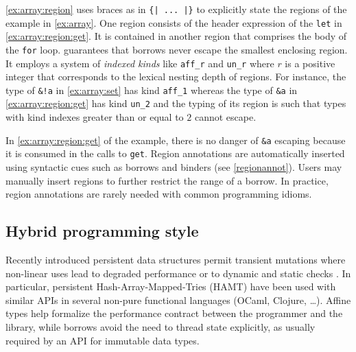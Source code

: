\cref{ex:array:region} uses braces as in \lstinline/{| ... |}/ to
explicitly state the regions of the example in \cref{ex:array}.  One
region consists of the header expression of the \lstinline/let/ in
\cref{ex:array:region:get}. It is contained in another region that
comprises the body of the \lstinline/for/ loop. \lang guarantees that borrows 
never escape the smallest enclosing region. It employs a system of
\emph{indexed kinds} like \lstinline{aff_r} and \lstinline{un_r} where
$r$ is a positive integer that corresponds to the lexical nesting
depth of regions. For instance, the type of \lstinline{&!a} in
\cref{ex:array:set} has kind \lstinline{aff_1} whereas the type of
\lstinline{&a} in \cref{ex:array:region:get} has kind
\lstinline{un_2} and the typing of its region is such that types with
kind indexes greater than or equal to $2$ cannot escape. 

In \cref{ex:array:region:get} of the example, there is no danger of \lstinline/&a/ escaping because it
is consumed in the calls to \lstinline/get/.
Region annotations are automatically inserted using
syntactic cues such as borrows and binders (see 
\cref{regionannot}).  Users may manually insert regions to further restrict the range of a
borrow. In practice, region annotations are
rarely needed with common programming idioms.






\subsection{Hybrid programming style}

Recently introduced persistent data structures
permit transient mutations where
non-linear uses lead to degraded performance
\cite{DBLP:conf/ml/ConchonF07} or to
dynamic and static checks \cite{DBLP:journals/pacmpl/Puente17}.
In particular, persistent Hash-Array-Mapped-Tries (HAMT) have been used with similar
APIs in several non-pure functional languages (OCaml, Clojure, \dots).
Affine types help formalize the performance contract between the programmer
and the library, while borrows avoid the need to thread state explicitly,
as usually required by an API for immutable data types.
%


